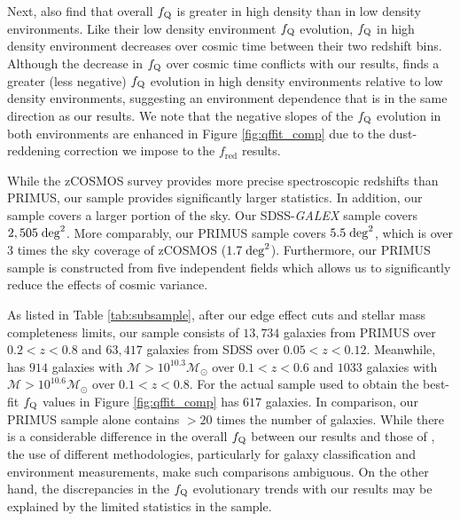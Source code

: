 \documentclass{emulateapj}
\begin{document}
Next, \cite{Kovac:2014aa} also find that overall $f_{\rm{Q}}$ is
greater in high density than in low density environments. Like their
low density environment $f_{\rm{Q}}$ evolution, $f_{\rm{Q}}$ in high
density environment decreases over cosmic time between their two
redshift bins. Although the decrease in $f_{\rm{Q}}$ over cosmic time
conflicts with our results, \cite{Kovac:2014aa} finds a greater (less
negative) $f_{\rm{Q}}$ evolution in high density environments relative
to low density environments, suggesting an environment dependence that
is in the same direction as our results. We note that the negative
slopes of the $f_{\rm{Q}}$ evolution in both environments are enhanced
in Figure \ref{fig:qffit_comp} due to the dust-reddening
correction we impose to the \cite{Kovac:2014aa} $f_{\mathrm{red}}$ results. 


While the zCOSMOS survey provides more precise spectroscopic redshifts than PRIMUS, our sample provides significantly larger statistics. In addition, our sample covers a larger portion of the sky. Our SDSS-{\em GALEX} sample covers $2,505 \;\rm{deg}^2$. More comparably, our PRIMUS sample covers $5.5 \;\rm{deg}^2$, which is over 3 times the sky coverage of zCOSMOS ($1.7 \;\rm{deg}^2$). Furthermore, our PRIMUS sample is constructed from five independent fields which allows us to significantly reduce the effects of cosmic variance. 

As listed in Table \ref{tab:subsample}, after our edge effect cuts and
stellar mass completeness limits, our sample consists of $13,734$
galaxies from PRIMUS over $0.2< z< 0.8$ and $63,417$ galaxies from
SDSS over $0.05 < z < 0.12$. Meanwhile, \cite{Iovino:2010aa} has $914$
galaxies with $\mathcal{M} > 10^{10.3} \mathcal{M}_{\odot}$ over $0.1
< z < 0.6$ and $1033$ galaxies with $\mathcal{M} > 10^{10.6}
\mathcal{M}_{\odot}$ over $0.1 < z < 0.8$. For the actual sample used
to obtain the best-fit $f_{\rm{Q}}$ values in Figure
\ref{fig:qffit_comp} \cite{Iovino:2010aa} has $617$ galaxies. In
comparison, our PRIMUS sample alone contains $> 20$ times the number
of galaxies. While there is a considerable difference in the overall
$f_{\rm{Q}}$ between our results and those of \cite{Iovino:2010aa},
the use of different methodologies, particularly for galaxy
classification and environment measurements, make such comparisons
ambiguous. On the other hand, the discrepancies in the $f_{\rm{Q}}$
evolutionary trends with our results may be explained by the limited
statistics in the \cite{Iovino:2010aa} sample.
\end{document}
